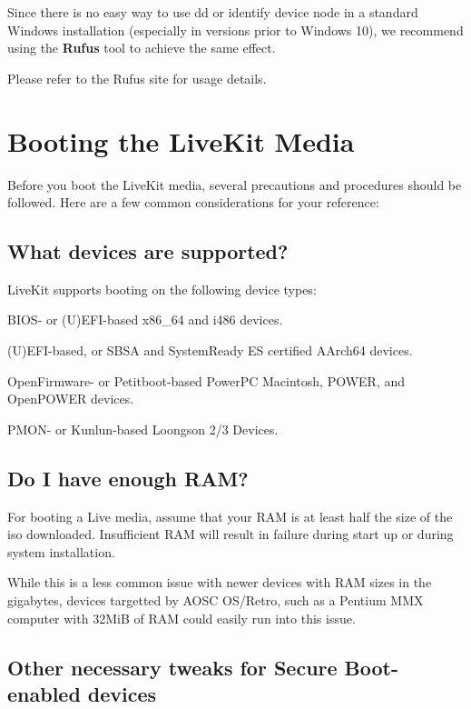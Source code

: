 \documentclass[a5paper,twosided,11pt]{book}
\begin{document}
    Since there is no easy way to use dd or identify device node in a standard Windows installation
    (especially in versions prior to Windows 10), we recommend using the \textbf{Rufus} tool to achieve the same effect.

    Please refer to the Rufus site for usage details.

    \section{Booting the LiveKit Media}
    
    Before you boot the LiveKit media, several precautions and procedures should be followed. Here are a few common considerations for your reference:
    
    \subsection{What devices are supported?}

    LiveKit supports booting on the following device types:

    \begin{compactitem}
        \item BIOS- or (U)EFI-based x86\_64 and i486 devices.
        \item (U)EFI-based, or SBSA and SystemReady ES certified AArch64 devices.
        \item OpenFirmware- or Petitboot-based PowerPC Macintosh, POWER, and OpenPOWER devices.
        \item PMON- or Kunlun-based Loongson 2/3 Devices.
    \end{compactitem}

    \subsection{Do I have enough RAM?}
    
    For booting a Live media, assume that your RAM is at least half the size of the iso downloaded. Insufficient RAM will result in failure during start up or during system installation.

    While this is a less common issue with newer devices with RAM sizes in the gigabytes, devices targetted by AOSC OS/Retro, such as a Pentium MMX computer with 32MiB of RAM could easily run into this issue.

    \subsection{Other necessary tweaks for Secure Boot-enabled devices}
\end{document}
